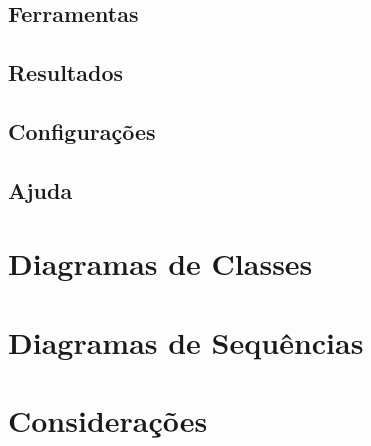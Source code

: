 \subsection{Ferramentas}
\subsection{Resultados}
\subsection{Configurações}
\subsection{Ajuda}

\section{Diagramas de Classes}

\section{Diagramas de Sequências}
\section{Considerações}
